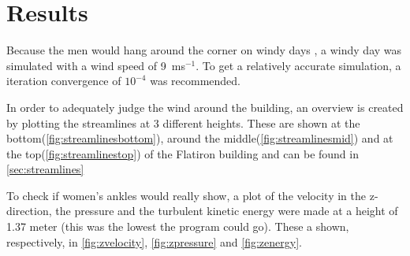 \section{Results}
\label{sec:results}
Because the men would hang around the corner on windy days \cite{dresses}, a windy day was simulated with a wind speed of 9~ms$^{-1}$. To get a relatively accurate simulation, a iteration convergence of $10^{-4}$ was recommended. 

In order to adequately judge the wind around the building, an overview is created by plotting the streamlines at 3 different heights. These are shown at the bottom(\autoref{fig:streamlinesbottom}), around the middle(\autoref{fig:streamlinesmid}) and at the top(\autoref{fig:streamlinestop}) of the Flatiron building and can be found in \autoref{sec:streamlines} 

To check if women's ankles would really show, a plot of the velocity in the z-direction, the pressure and the turbulent kinetic energy were made at a height of 1.37 meter (this was the lowest the program could go). These a shown, respectively, in \autoref{fig:zvelocity}, \ref{fig:zpressure} and \ref{fig:zenergy}.

